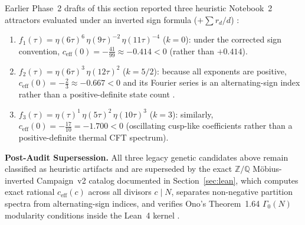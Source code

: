 Earlier Phase~2 drafts of this section reported three heuristic Notebook~2 attractors evaluated under an inverted sign formula ($+\sum r_d/d$) \cite{EOT2011}:
\begin{enumerate}
    \item $f_1(\tau) = \eta(6\tau)^6\,\eta(9\tau)^{-2}\,\eta(11\tau)^{-4}$ ($k = 0$): under the corrected sign convention, $c_{\text{eff}}(0) = -\frac{41}{99} \approx -0.414 < 0$ (rather than $+0.414$).
    \item $f_2(\tau) = \eta(6\tau)^3\,\eta(12\tau)^2$ ($k = 5/2$): because all exponents are positive, $c_{\text{eff}}(0) = -\frac{2}{3} \approx -0.667 < 0$ and its Fourier series is an alternating-sign index rather than a positive-definite state count \cite{Zwegers2002}.
    \item $f_3(\tau) = \eta(\tau)^1\,\eta(5\tau)^2\,\eta(10\tau)^3$ ($k = 3$): similarly, $c_{\text{eff}}(0) = -\frac{17}{10} = -1.700 < 0$ (oscillating cusp-like coefficients rather than a positive-definite thermal CFT spectrum).
\end{enumerate}

\noindent\textbf{Post-Audit Supersession.} All three legacy genetic candidates above remain classified as \tierC{} heuristic artifacts and are superseded by the exact $\mathbb{Z}/\mathbb{Q}$ M\"{o}bius-inverted Campaign~v2 catalog documented in Section~\ref{sec:lean}, which computes exact rational $c_{\text{eff}}(c)$ across all divisors $c \mid N$, separates non-negative partition spectra from alternating-sign indices, and verifies Ono's Theorem~1.64 $\Gamma_0(N)$ modularity conditions inside the Lean~4 kernel \cite{GPPV2020}.
